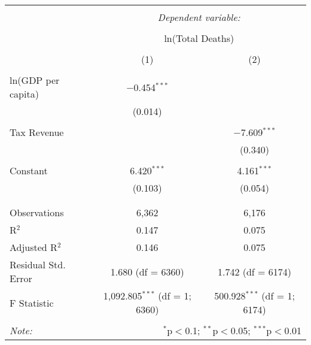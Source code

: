  \begin{table}[!htbp] \centering    \caption{}    \label{}  \begin{tabular}{@{\extracolsep{5pt}}lcc}  \\[-1.8ex]\hline  \hline \\[-1.8ex]   & \multicolumn{2}{c}{\textit{Dependent variable:}} \\  \cline{2-3}  \\[-1.8ex] & \multicolumn{2}{c}{ln(Total Deaths)} \\  \\[-1.8ex] & (1) & (2)\\  \hline \\[-1.8ex]   ln(GDP per capita) & $-$0.454$^{***}$ &  \\    & (0.014) &  \\    & & \\   Tax Revenue &  & $-$7.609$^{***}$ \\    &  & (0.340) \\    & & \\   Constant & 6.420$^{***}$ & 4.161$^{***}$ \\    & (0.103) & (0.054) \\    & & \\  \hline \\[-1.8ex]  Observations & 6,362 & 6,176 \\  R$^{2}$ & 0.147 & 0.075 \\  Adjusted R$^{2}$ & 0.146 & 0.075 \\  Residual Std. Error & 1.680 (df = 6360) & 1.742 (df = 6174) \\  F Statistic & 1,092.805$^{***}$ (df = 1; 6360) & 500.928$^{***}$ (df = 1; 6174) \\  \hline  \hline \\[-1.8ex]  \textit{Note:}  & \multicolumn{2}{r}{$^{*}$p$<$0.1; $^{**}$p$<$0.05; $^{***}$p$<$0.01} \\  \end{tabular}  \end{table} 